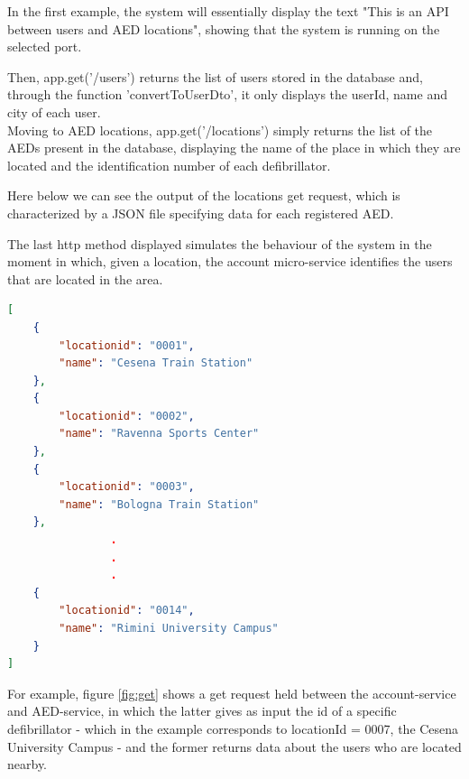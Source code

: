 \documentclass[11pt,a4paper]{article}
\begin{document}
In the first example, the system will essentially display the text "This is an API between users and AED locations", showing that the system is running on the selected port.

Then, app.get('/users') returns the list of users stored in the database and, through the function 'convertToUserDto', it only displays the userId, name and city of each user. \\



Moving to AED locations, app.get('/locations') simply returns the list of the AEDs present in the database, displaying the name of the place in which they are located and the identification number of each defibrillator.

Here below we can see the output of the locations get request, which is characterized by a JSON file specifying data for each registered AED.

The last http method displayed simulates the behaviour of the system in the moment in which, given a location, the account micro-service identifies the users that are located in the area. \\

\begin{lstlisting}[language=JSON]
[
    {
        "locationid": "0001",
        "name": "Cesena Train Station"
    },
    {
        "locationid": "0002",
        "name": "Ravenna Sports Center"
    },
    {
        "locationid": "0003",
        "name": "Bologna Train Station"
    },
                .
                .
                .
    {
        "locationid": "0014",
        "name": "Rimini University Campus"
    }
]
\end{lstlisting}

For example, figure \ref{fig:get} shows a get request held between the account-service and AED-service, in which the latter gives as input the id of a specific defibrillator - which in the example corresponds to locationId = 0007, the Cesena University Campus - and the former returns data about the users who are located nearby.
\end{document}
